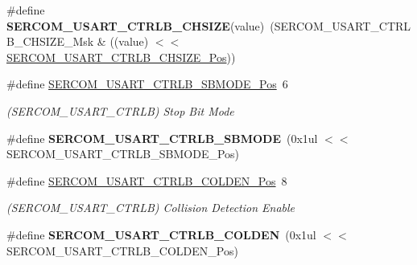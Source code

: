 \begin{DoxyCompactItemize}
\item 
\hypertarget{group___s_a_m_l21___s_e_r_c_o_m_gaf89948d194e1940fd23d187a09a2126c}{}\#define {\bfseries S\+E\+R\+C\+O\+M\+\_\+\+U\+S\+A\+R\+T\+\_\+\+C\+T\+R\+L\+B\+\_\+\+C\+H\+S\+I\+Z\+E}(value)~(S\+E\+R\+C\+O\+M\+\_\+\+U\+S\+A\+R\+T\+\_\+\+C\+T\+R\+L\+B\+\_\+\+C\+H\+S\+I\+Z\+E\+\_\+\+Msk \& ((value) $<$$<$ \hyperlink{group___s_a_m_l21___s_e_r_c_o_m_ga90b481f2faa23fa9beea38ee7dcce94d}{S\+E\+R\+C\+O\+M\+\_\+\+U\+S\+A\+R\+T\+\_\+\+C\+T\+R\+L\+B\+\_\+\+C\+H\+S\+I\+Z\+E\+\_\+\+Pos}))\label{group___s_a_m_l21___s_e_r_c_o_m_gaf89948d194e1940fd23d187a09a2126c}

\item 
\hypertarget{group___s_a_m_l21___s_e_r_c_o_m_ga9cb2bda1f98dbb34f0b89a3fe55975c5}{}\#define \hyperlink{group___s_a_m_l21___s_e_r_c_o_m_ga9cb2bda1f98dbb34f0b89a3fe55975c5}{S\+E\+R\+C\+O\+M\+\_\+\+U\+S\+A\+R\+T\+\_\+\+C\+T\+R\+L\+B\+\_\+\+S\+B\+M\+O\+D\+E\+\_\+\+Pos}~6\label{group___s_a_m_l21___s_e_r_c_o_m_ga9cb2bda1f98dbb34f0b89a3fe55975c5}

\begin{DoxyCompactList}\small\item\em (S\+E\+R\+C\+O\+M\+\_\+\+U\+S\+A\+R\+T\+\_\+\+C\+T\+R\+L\+B) Stop Bit Mode \end{DoxyCompactList}\item 
\hypertarget{group___s_a_m_l21___s_e_r_c_o_m_gae1962e954c94eff0571efb02fe20c328}{}\#define {\bfseries S\+E\+R\+C\+O\+M\+\_\+\+U\+S\+A\+R\+T\+\_\+\+C\+T\+R\+L\+B\+\_\+\+S\+B\+M\+O\+D\+E}~(0x1ul $<$$<$ S\+E\+R\+C\+O\+M\+\_\+\+U\+S\+A\+R\+T\+\_\+\+C\+T\+R\+L\+B\+\_\+\+S\+B\+M\+O\+D\+E\+\_\+\+Pos)\label{group___s_a_m_l21___s_e_r_c_o_m_gae1962e954c94eff0571efb02fe20c328}

\item 
\hypertarget{group___s_a_m_l21___s_e_r_c_o_m_ga170496bb8307464e02214c3e103e2184}{}\#define \hyperlink{group___s_a_m_l21___s_e_r_c_o_m_ga170496bb8307464e02214c3e103e2184}{S\+E\+R\+C\+O\+M\+\_\+\+U\+S\+A\+R\+T\+\_\+\+C\+T\+R\+L\+B\+\_\+\+C\+O\+L\+D\+E\+N\+\_\+\+Pos}~8\label{group___s_a_m_l21___s_e_r_c_o_m_ga170496bb8307464e02214c3e103e2184}

\begin{DoxyCompactList}\small\item\em (S\+E\+R\+C\+O\+M\+\_\+\+U\+S\+A\+R\+T\+\_\+\+C\+T\+R\+L\+B) Collision Detection Enable \end{DoxyCompactList}\item 
\hypertarget{group___s_a_m_l21___s_e_r_c_o_m_ga9a6695251cc033ef98b7bf40bf00f6a1}{}\#define {\bfseries S\+E\+R\+C\+O\+M\+\_\+\+U\+S\+A\+R\+T\+\_\+\+C\+T\+R\+L\+B\+\_\+\+C\+O\+L\+D\+E\+N}~(0x1ul $<$$<$ S\+E\+R\+C\+O\+M\+\_\+\+U\+S\+A\+R\+T\+\_\+\+C\+T\+R\+L\+B\+\_\+\+C\+O\+L\+D\+E\+N\+\_\+\+Pos)\label{group___s_a_m_l21___s_e_r_c_o_m_ga9a6695251cc033ef98b7bf40bf00f6a1}


\end{DoxyCompactItemize}
